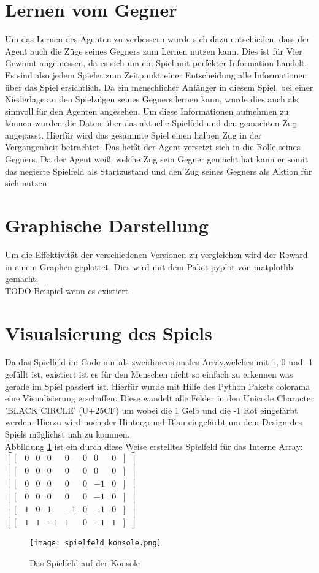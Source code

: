 \section{Lernen vom Gegner}
Um das Lernen des Agenten zu verbessern wurde sich dazu entschieden, dass der Agent auch die Züge seines Gegners zum Lernen nutzen kann. Dies ist für Vier Gewinnt angemessen, da es sich um ein Spiel mit perfekter Information handelt. Es sind also jedem Spieler zum Zeitpunkt einer Entscheidung alle Informationen über das Spiel ersichtlich. Da ein menschlicher Anfänger in diesem Spiel, bei einer Niederlage an den Spielzügen seines Gegners lernen kann, wurde dies auch als sinnvoll für den Agenten angesehen. Um diese Informationen aufnehmen zu können wurden die Daten über das aktuelle Spielfeld und den gemachten Zug angepasst. Hierfür wird das gesammte Spiel einen halben Zug in der Vergangenheit betrachtet. Das heißt der Agent versetzt sich in die Rolle seines Gegners. Da der Agent weiß, welche Zug sein Gegner gemacht hat kann er somit das negierte Spielfeld als Startzustand und den Zug seines Gegners als Aktion für sich nutzen. 

\section{Graphische Darstellung}
Um die Effektivität der verschiedenen Versionen zu vergleichen wird der Reward in einem Graphen geplottet. Dies wird mit dem Paket pyplot von matplotlib gemacht.\\
\colorbox{red!30}{TODO Beispiel wenn es existiert}

\section{Visualsierung des Spiels}
\label{sec:visualisierung}
Da das Spielfeld im Code nur als zweidimensionales Array,welches mit 1, 0 und -1 gefüllt ist, existiert ist es für den Menschen nicht so einfach zu erkennen was gerade im Spiel passiert ist. Hierfür wurde mit Hilfe des Python Pakets colorama eine Visualisierung erschaffen. Diese wandelt alle Felder in den Unicode Character 'BLACK CIRCLE' (U+25CF) um wobei die 1 Gelb und die -1 Rot eingefärbt werden. Hierzu wird noch der Hintergrund Blau eingefärbt um dem Design des Spiels möglichst nah zu kommen. \\
Abbildung \ref{fig:spielfeld_konsole} ist ein durch diese Weise erstelltes Spielfeld für das Interne Array:
$\begin{bmatrix}                                
[ \, & 0  & 0 & 0 & 0 & 0 & 0 & 0& ]\, \\                                               
[ \, & 0  & 0 & 0 & 0 & 0 & 0 & 0& ]\, \\  
[ \, & 0  & 0 & 0 & 0 & 0 & -1 & 0& ]\, \\  
[ \, & 0  & 0 & 0 & 0 & 0 & -1 & 0& ]\, \\  
[ \, & 1  & 0 & 1 & -1 & 0 & -1 & 0& ]\, \\  
[ \, & 1  & 1 & -1 & 1 & 0 & -1 & 1& ]\,                                               
\end{bmatrix}$


\begin{figure}[h!]
  \texttt{[image: spielfeld\_konsole.png]}
  \centering
  \caption{Das Spielfeld auf der Konsole}
  \label{fig:spielfeld_konsole}
\end{figure}
